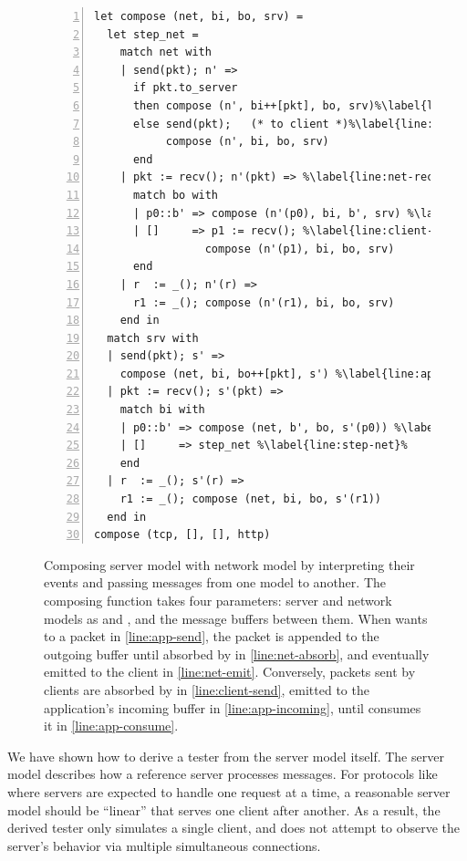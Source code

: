 \begin{figure}
  \begin{lstlisting}[style=customcoq,numbers=left,stepnumber=1,escapechar=\%]
let compose (net, bi, bo, srv) =
  let step_net =
    match net with
    | send(pkt); n' =>
      if pkt.to_server
      then compose (n', bi++[pkt], bo, srv)%\label{line:app-incoming}%
      else send(pkt);   (* to client *)%\label{line:net-emit}%
           compose (n', bi, bo, srv)
      end
    | pkt := recv(); n'(pkt) => %\label{line:net-recv}%
      match bo with
      | p0::b' => compose (n'(p0), bi, b', srv) %\label{line:net-absorb}%
      | []     => p1 := recv(); %\label{line:client-send}%
                 compose (n'(p1), bi, bo, srv)
      end
    | r  := _(); n'(r) =>
      r1 := _(); compose (n'(r1), bi, bo, srv)
    end in
  match srv with
  | send(pkt); s' =>
    compose (net, bi, bo++[pkt], s') %\label{line:app-send}%
  | pkt := recv(); s'(pkt) =>
    match bi with
    | p0::b' => compose (net, b', bo, s'(p0)) %\label{line:app-consume}%
    | []     => step_net %\label{line:step-net}%
    end
  | r  := _(); s'(r) =>
    r1 := _(); compose (net, bi, bo, s'(r1))
  end in
compose (tcp, [], [], http)
  \end{lstlisting}
  \caption{Composing  server model with  network model by interpreting
    their events and passing messages from one model to another.  The composing
    function takes four parameters: server and network models as  and ,
    and the message buffers between them.  When  wants to  a
    packet in \autoref{line:app-send}, the packet is appended to the outgoing
    buffer  until absorbed by  in \autoref{line:net-absorb},
    and eventually emitted to the client in \autoref{line:net-emit}.
    Conversely, packets sent by clients are absorbed by  in
    \autoref{line:client-send}, emitted to the application's incoming buffer
     in \autoref{line:app-incoming}, until  consumes it in
    \autoref{line:app-consume}.
  }
  \label{fig:net-compose}
\end{figure}
We have shown how to derive a tester from the server model itself.
The server model describes how a reference server processes messages.  For
protocols like \http where servers are expected to handle one request at a time,
a reasonable server model should be ``linear'' that serves one client after another.
As a result, the derived tester only simulates a single client, and does not
attempt to observe the server's behavior via multiple simultaneous connections.

